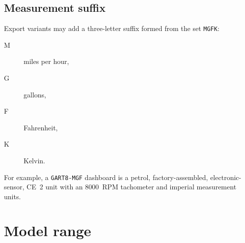 \subsection{Measurement suffix}
Export variants may add a three-letter suffix formed from the set \texttt{MGFK}:
\begin{description}
    \item[M] miles per hour,
    \item[G] gallons,
    \item[F] Fahrenheit,
    \item[K] Kelvin.
\end{description}
For example, a \texttt{GART8-MGF} dashboard is a petrol, factory-assembled, electronic-sensor, CE~2 unit with an 8000~RPM tachometer and imperial measurement units.

\section{Model range}
